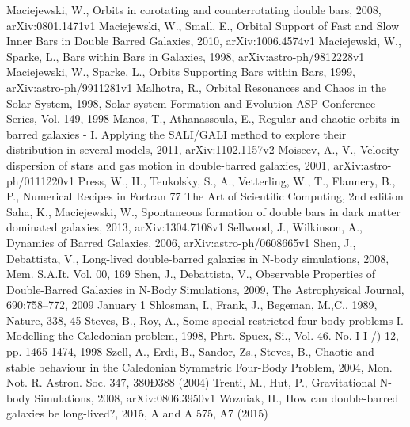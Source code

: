 \documentclass[a4paper,12pt]{article}
\begin{document}
\begin{thebibliography}{1}
Maciejewski, W., Orbits in corotating and counterrotating double bars, 2008, arXiv:0801.1471v1
Maciejewski, W., Small, E., Orbital Support of Fast and Slow Inner Bars in Double Barred Galaxies, 2010, arXiv:1006.4574v1
Maciejewski, W., Sparke, L., Bars within Bars in Galaxies, 1998, arXiv:astro-ph/9812228v1
Maciejewski, W., Sparke, L., Orbits Supporting Bars within Bars, 1999, arXiv:astro-ph/9911281v1
Malhotra, R., Orbital Resonances and Chaos in the Solar System, 1998, Solar system Formation and Evolution ASP Conference Series, Vol. 149, 1998
Manos, T., Athanassoula, E., Regular and chaotic orbits in barred galaxies - I. Applying the SALI/GALI method to explore their distribution in several models, 2011, arXiv:1102.1157v2
Moiseev, A., V., Velocity dispersion of stars and gas motion in double-barred galaxies, 2001, arXiv:astro-ph/0111220v1
Press, W., H., Teukolsky, S., A., Vetterling, W., T., Flannery, B., P., Numerical Recipes in Fortran 77 The Art of Scientific Computing, 2nd edition
Saha, K., Maciejewski, W., Spontaneous formation of double bars in dark matter dominated galaxies, 2013, arXiv:1304.7108v1
Sellwood, J., Wilkinson, A., Dynamics of Barred Galaxies, 2006, arXiv:astro-ph/0608665v1
Shen, J., Debattista, V., Long-lived double-barred galaxies in N-body simulations, 2008, Mem. S.A.It. Vol. 00, 169
Shen, J., Debattista, V., Observable Properties of Double-Barred Galaxies in N-Body Simulations, 2009, The Astrophysical Journal, 690:758–772, 2009 January 1
Shlosman, I., Frank, J., Begeman, M.,C., 1989, Nature, 338, 45
Steves, B., Roy, A., Some special restricted four-body problems-I. Modelling the Caledonian problem, 1998, Phrt. Spucx, Si., Vol. 46. No. I I /) 12, pp. 1465-1474, 1998
Szell, A., Erdi, B., Sandor, Zs., Steves, B., Chaotic and stable behaviour in the Caledonian Symmetric Four-Body Problem, 2004, Mon. Not. R. Astron. Soc. 347, 380Ð388 (2004)
Trenti, M., Hut, P., Gravitational N-body Simulations, 2008, arXiv:0806.3950v1
Wozniak, H., How can double-barred galaxies be long-lived?, 2015, A and A 575, A7 (2015)
\end{thebibliography}
\end{document}
